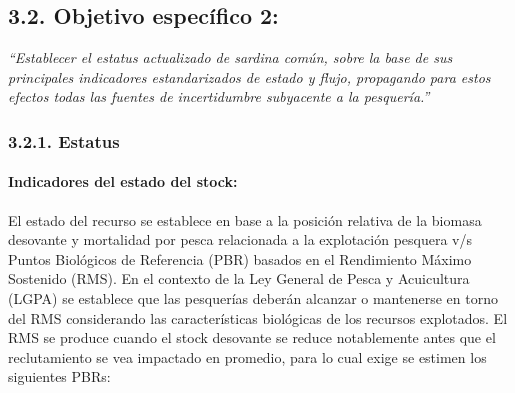 \documentclass[
  spanish,
]{article}
\begin{document}
\pagebreak

\hypertarget{objetivo-especuxedfico-2}{%
\subsection{3.2. Objetivo específico
2:}\label{objetivo-especuxedfico-2}}

\vspace{-0.2cm}

\emph{``Establecer el estatus actualizado de sardina común, sobre la
base de sus principales indicadores estandarizados de estado y flujo,
propagando para estos efectos todas las fuentes de incertidumbre
subyacente a la pesquería.''}

\hypertarget{estatus}{%
\subsubsection{3.2.1. Estatus}\label{estatus}}

\hypertarget{indicadores-del-estado-del-stock}{%
\paragraph{Indicadores del estado del
stock:}\label{indicadores-del-estado-del-stock}}

El estado del recurso se establece en base a la posición relativa de la
biomasa desovante y mortalidad por pesca relacionada a la explotación
pesquera v/s Puntos Biológicos de Referencia (PBR) basados en el
Rendimiento Máximo Sostenido (RMS). En el contexto de la Ley General de
Pesca y Acuicultura (LGPA) se establece que las pesquerías deberán
alcanzar o mantenerse en torno del RMS considerando las características
biológicas de los recursos explotados. El RMS se produce cuando el stock
desovante se reduce notablemente antes que el reclutamiento se vea
impactado en promedio, para lo cual exige se estimen los siguientes
PBRs:
\end{document}
